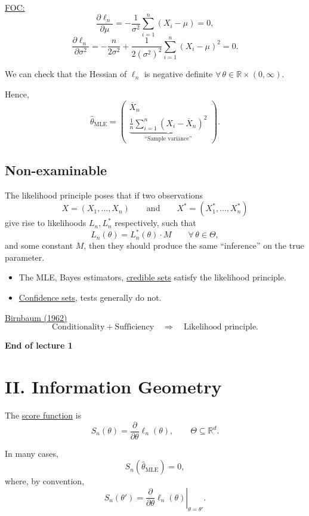 \documentclass[11pt,a4paper]{article}
\begin{document}
\noindent\underline{FOC:}
\[
\frac{\partial\ell_n}{\partial\mu}
=
-\frac{1}{\sigma^2}
\sum_{i=1}^{n}(X_i-\mu)
=0,
\]
\[
\frac{\partial\ell_n}{\partial\sigma^2}
=
-\frac{n}{2\sigma^2}
+
\frac{1}{2(\sigma^2)^2}
\sum_{i=1}^{n}(X_i-\mu)^2
=0.
\]

We can check that the Hessian of $\ell_n$ is negative definite
$\forall\,\theta\in\mathbb{R}\times(0,\infty)$.

Hence,
\[
\widehat{\theta}_{\mathrm{MLE}}
=
\begin{pmatrix}
\overline{X}_n \\[6pt]
\underbrace{
\displaystyle\frac{1}{n}
\sum_{i=1}^{n}(X_i-\overline{X}_n)^2
}_{\text{``Sample variance''}}
\end{pmatrix}.
\]

\subsection*{Non-examinable}

The likelihood principle poses that if two observations
\[
X=(X_1,\ldots,X_n)
\qquad\text{and}\qquad
X^*=(X_1^*,\ldots,X_n^*)
\]
give rise to likelihoods $L_n,L_n^*$ respectively, such that
\[
L_n(\theta)=L_n^*(\theta)\cdot M
\qquad \forall\,\theta\in\Theta,
\]
and some constant $M$, then they should produce the same
``inference'' on the true parameter.

\begin{itemize}
    \item The MLE, Bayes estimators, \underline{credible sets}
    satisfy the likelihood principle.
    \item \underline{Confidence sets}, tests generally do not.
\end{itemize}

\noindent\underline{Birnbaum (1962)}
\[
\text{Conditionality}+\text{Sufficiency}
\quad\Longrightarrow\quad
\text{Likelihood principle}.
\]

\begin{center}
\textbf{End of lecture 1}
\end{center}

\section*{II. Information Geometry}

The \underline{score function} is
\[
S_n(\theta)
=
\frac{\partial}{\partial\theta}\ell_n(\theta),
\qquad
\Theta\subseteq\mathbb{R}^d.
\]

In many cases,
\[
S_n(\widehat{\theta}_{\mathrm{MLE}})=0,
\]
where, by convention,
\[
S_n(\theta')
=
\left.
\frac{\partial}{\partial\theta}\ell_n(\theta)
\right|_{\theta=\theta'}.
\]
\end{document}
